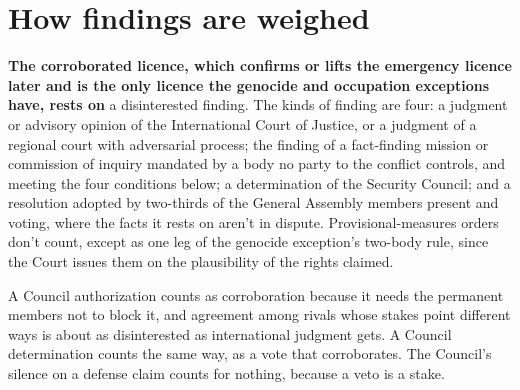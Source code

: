 \section{How findings are weighed}
\label{sec:G.1}
\textbf{The corroborated licence, which confirms or lifts the emergency licence later and is the only licence the genocide and occupation exceptions have, rests on} a disinterested finding. The kinds of finding are four: a judgment or advisory opinion of the International Court of Justice, or a judgment of a regional court with adversarial process; the finding of a fact-finding mission or commission of inquiry mandated by a body no party to the conflict controls, and meeting the four conditions below; a determination of the Security Council; and a resolution adopted by two-thirds of the General Assembly members present and voting, where the facts it rests on aren't in dispute. Provisional-measures orders don't count, except as one leg of the genocide exception's two-body rule, since the Court issues them on the plausibility of the rights claimed.

A Council authorization counts as corroboration because it needs the permanent members not to block it, and agreement among rivals whose stakes point different ways is about as disinterested as international judgment gets. A Council determination counts the same way, as a vote that corroborates. The Council's silence on a defense claim counts for nothing, because a veto is a stake.

